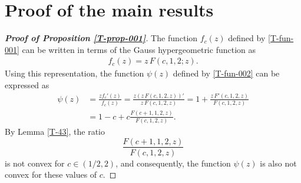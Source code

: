 \documentclass[a4paper,12pt]{amsart}
\theoremstyle{definition}
\begin{document}
\section{Proof of the main results}\label{T-section-003}



\begin{proof}[\textbf{Proof of Proposition \ref{T-prop-001}}]
The function $f_c(z)$ defined by \eqref{T-fun-001} can be written
in terms of the Gauss hypergeometric function as
\begin{align*}
f_c(z) = z \, F(c, 1, 2; z).
\end{align*}
Using this representation, the function $\psi(z)$ defined by \eqref{T-fun-002} can be expressed as
\begin{align*}
\psi(z)
&=\frac{zf_c'(z)}{f_c(z)}
=\frac{z(z \, F(c,1,2,z))'}{z \, F(c,1,2,z)}
= 1 + \frac{z \, F'(c,1,2,z)}{F(c,1,2,z)} \\
&= 1 - c + c\frac{F(c+1,1,2,z)}{F(c,1,2,z)}.
\end{align*}
By Lemma \ref{T-43}, the ratio 
$$\frac{F(c+1,1,2,z)}{F(c,1,2,z)}$$
is not convex for $c\in (1/2,2)$, and consequently, the function  $\psi(z)$ is also not convex for these values of $c$.
\end{proof}
\end{document}
